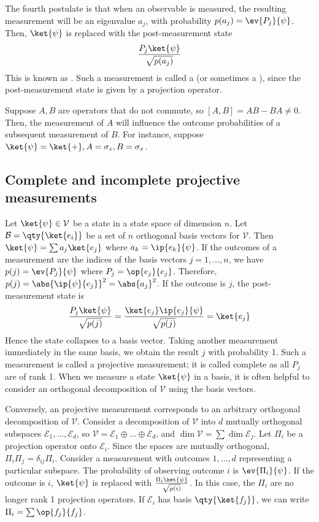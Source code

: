 The fourth postulate is that when an observable is measured, the resulting measurement will be an eigenvalue $a_j$, with probability $p(a_j) = \ev{P_j}{\psi}$.
Then, $\ket{\psi}$ is replaced with the post-measurement state
\[ \frac{P_j \ket{\psi}}{\sqrt{p(a_j)}} \]
This is known as .
Such a measurement is called a  (or sometimes a ), since the post-measurement state is given by a projection operator.

Suppose $A, B$ are operators that do not commute, so $[A,B] = AB - BA \neq 0$.
Then, the measurement of $A$ will influence the outcome probabilities of a subsequent measurement of $B$.
For instance, suppose $\ket{\psi} = \ket{+}, A = \sigma_z, B = \sigma_x$.

\subsection{Complete and incomplete projective measurements}
Let $\ket{\psi} \in \mathcal V$ be a state in a state space of dimension $n$.
Let $\mathcal B = \qty{\ket{e_i}}$ be a set of $n$ orthogonal basis vectors for $\mathcal V$.
Then $\ket{\psi} = \sum a_j \ket{e_j}$ where $a_k = \ip{e_k}{\psi}$.
If the outcomes of a measurement are the indices of the basis vectors $j = 1, \dots, n$, we have $p(j) = \ev{P_j}{\psi}$ where $P_j = \op{e_j}{e_j}$.
Therefore, $p(j) = \abs{\ip{\psi}{e_j}}^2 = \abs{a_j}^2$.
If the outcome is $j$, the post-measurement state is
\[ \frac{P_j \ket{\psi}}{\sqrt{p(j)}} = \frac{\ket{e_j} \ip{e_j}{\psi}}{\sqrt{p(j)}} = \ket{e_j} \]
Hence the state collapses to a basis vector.
Taking another measurement immediately in the same basis, we obtain the result $j$ with probability 1.
Such a measurement is called a  projective measurement; it is called complete as all $P_j$ are of rank 1.
When we measure a state $\ket{\psi}$ in a basis, it is often helpful to consider an orthogonal decomposition of $\mathcal V$ using the basis vectors.

Conversely, an  projective measurement corresponds to an arbitrary orthogonal decomposition of $\mathcal V$.
Consider a decomposition of $\mathcal V$ into $d$ mutually orthogonal subspaces $\mathcal E_1, \dots, \mathcal E_d$, so $\mathcal V = \mathcal E_1 \oplus \dots \oplus \mathcal E_d$, and $\dim \mathcal V = \sum \dim \mathcal E_j$.
Let $\Pi_i$ be a projection operator onto $\mathcal E_i$.
Since the spaces are mutually orthogonal, $\Pi_i \Pi_j = \delta_{ij} \Pi_i$.
Consider a measurement with outcomes $1, \dots, d$ representing a particular subspace.
The probability of observing outcome $i$ is $\ev{\Pi_i}{\psi}$.
If the outcome is $i$, $\ket{\psi}$ is replaced with $\frac{\Pi_i \ket{\psi}}{\sqrt{p(i)}}$.
In this case, the $\Pi_i$ are no longer rank 1 projection operators.
If $\mathcal E_i$ has basis $\qty{\ket{f_j}}$, we can write $\Pi_i = \sum \op{f_j}{f_j}$.


